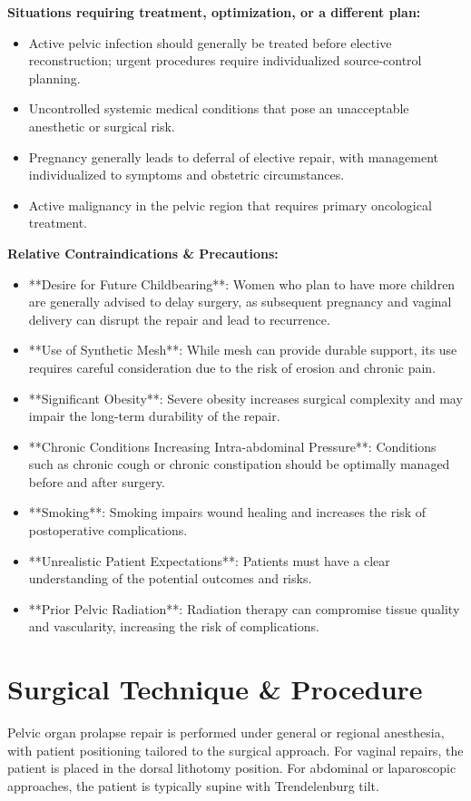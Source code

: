 \textbf{Situations requiring treatment, optimization, or a different plan:}
\begin{itemize}
  \item Active pelvic infection should generally be treated before elective reconstruction; urgent procedures require individualized source-control planning.
  \item Uncontrolled systemic medical conditions that pose an unacceptable anesthetic or surgical risk.
  \item Pregnancy generally leads to deferral of elective repair, with management individualized to symptoms and obstetric circumstances.
  \item Active malignancy in the pelvic region that requires primary oncological treatment.
\end{itemize}

\textbf{Relative Contraindications \& Precautions:}
\begin{itemize}
  \item **Desire for Future Childbearing**: Women who plan to have more children are generally advised to delay surgery, as subsequent pregnancy and vaginal delivery can disrupt the repair and lead to recurrence.
  \item **Use of Synthetic Mesh**: While mesh can provide durable support, its use requires careful consideration due to the risk of erosion and chronic pain.
  \item **Significant Obesity**: Severe obesity increases surgical complexity and may impair the long-term durability of the repair.
  \item **Chronic Conditions Increasing Intra-abdominal Pressure**: Conditions such as chronic cough or chronic constipation should be optimally managed before and after surgery.
  \item **Smoking**: Smoking impairs wound healing and increases the risk of postoperative complications.
  \item **Unrealistic Patient Expectations**: Patients must have a clear understanding of the potential outcomes and risks.
  \item **Prior Pelvic Radiation**: Radiation therapy can compromise tissue quality and vascularity, increasing the risk of complications.
\end{itemize}

\section*{Surgical Technique \& Procedure}
Pelvic organ prolapse repair is performed under general or regional anesthesia, with patient positioning tailored to the surgical approach. For vaginal repairs, the patient is placed in the dorsal lithotomy position. For abdominal or laparoscopic approaches, the patient is typically supine with Trendelenburg tilt.

